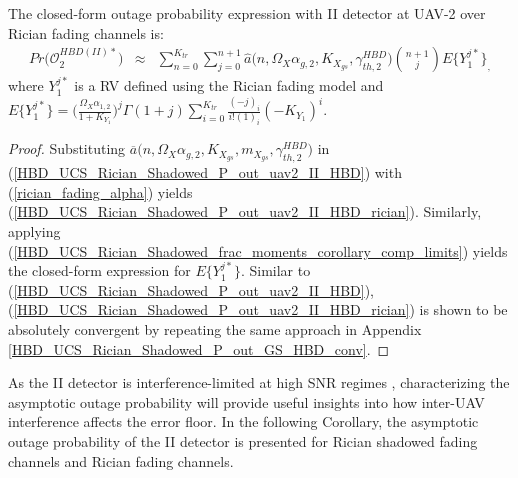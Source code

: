\begin{corollary} \label{HBD_UCS_Rician_Shadowed_corollary_P_out_uav2_II_HBD_rician}
The closed-form outage probability expression with II detector at UAV-2 over Rician fading channels is:
\begin{eqnarray} \label{HBD_UCS_Rician_Shadowed_P_out_uav2_II_HBD_rician}
Pr\big(\mathcal{O}_{2}^{HBD(II)*}\big) & \approx & \sum_{n=0}^{K_{tr}} \sum_{j=0}^{n+1} \widehat{a}\big(n,\Omega_X\alpha_{g,2},K_{X_{gs}},\gamma_{th,2}^{HBD}\big) \binom{n+1}{j} E\{Y_1^{j*}\}_,
\end{eqnarray}
where $Y_1^{j*}$ is a RV defined using the Rician fading model and $E\{Y_1^{j*}\} = \Big(\frac{\Omega_X\alpha_{1,2}}{1+K_{Y_1}}\Big)^j \Gamma(1+j) \sum_{i=0}^{K_{tr}} \frac{(-j)_i}{i!(1)_i}{(-K_{Y_{1}})^i}$.
\end{corollary}
\begin{proof}
Substituting $\overline{a}\big(n,\Omega_X\alpha_{g,2},K_{X_{gs}},m_{X_{gs}},\gamma_{th,2}^{HBD}\big)$ in (\ref{HBD_UCS_Rician_Shadowed_P_out_uav2_II_HBD}) with (\ref{rician_fading_alpha}) yields (\ref{HBD_UCS_Rician_Shadowed_P_out_uav2_II_HBD_rician}). Similarly, applying (\ref{HBD_UCS_Rician_Shadowed_frac_moments_corollary_comp_limits}) yields the closed-form expression for $E\{Y_1^{j*}\}$. Similar to (\ref{HBD_UCS_Rician_Shadowed_P_out_uav2_II_HBD}), (\ref{HBD_UCS_Rician_Shadowed_P_out_uav2_II_HBD_rician}) is shown to be absolutely convergent by repeating the same approach in Appendix \ref{HBD_UCS_Rician_Shadowed_P_out_GS_HBD_conv}.
\end{proof}

As the II detector is interference-limited at high SNR regimes \cite{ernest2019outage}, characterizing the asymptotic outage probability will provide useful insights into how inter-UAV interference affects the error floor. In the following Corollary, the asymptotic outage probability of the II detector is presented for Rician shadowed fading channels and Rician fading channels.

